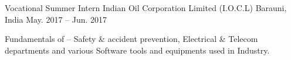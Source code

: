 \vspace{-9pt}
\begin{cventries}
\cventry
{Vocational Summer Intern} %
{Indian Oil Corporation Limited (I.O.C.L)} %
{Barauni, India} %
{May. 2017 – Jun. 2017} %
{ %
\begin{cvitems}
\item {Fundamentals of – Safety \& accident prevention, Electrical \& Telecom\\departments and various Software tools and equipments used in Industry.}
\end{cvitems}
}
\end{cventries}
